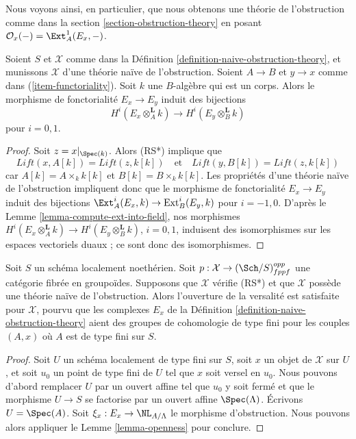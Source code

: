 \noindent
Nous voyons ainsi, en particulier, que nous obtenons une théorie de l'obstruction
comme dans la section \ref{section-obstruction-theory} en posant
$\mathcal{O}_x( - ) = \Ext^1_A(E_x, -)$.

\begin{lemma}
\label{lemma-naive-obstruction-theory-qis}
Soient $S$ et $\mathcal{X}$ comme dans la
Définition \ref{definition-naive-obstruction-theory},
et munissons $\mathcal{X}$ d'une théorie naïve de l'obstruction.
Soient $A \to B$ et $y \to x$ comme dans (\ref{item-functoriality}).
Soit $k$ une $B$-algèbre qui est un corps. Alors le morphisme de fonctorialité
$E_x \to E_y$ induit des bijections
$$
H^i(E_x \otimes_A^{\mathbf{L}} k) \to H^i(E_y \otimes_B^{\mathbf{L}} k)
$$
pour $i = 0, 1$.
\end{lemma}

\begin{proof}
Soit $z = x|_{\Spec(k)}$. Alors (RS*) implique que
$$
\textit{Lift}(x, A[k]) = \textit{Lift}(z, k[k])
\quad\text{et}\quad
\textit{Lift}(y, B[k]) = \textit{Lift}(z, k[k])
$$
car $A[k] = A \times_k k[k]$ et $B[k] = B \times_k k[k]$.
Les propriétés d'une théorie naïve de l'obstruction impliquent donc que le
morphisme de fonctorialité $E_x \to E_y$ induit des bijections
$\Ext^i_A(E_x, k) \to \text{Ext}^i_B(E_y, k)$
pour $i = -1, 0$. D'après le Lemme \ref{lemma-compute-ext-into-field}, nos morphismes
$H^i(E_x \otimes_A^{\mathbf{L}} k) \to H^i(E_y \otimes_B^{\mathbf{L}} k)$,
$i = 0, 1$, induisent des isomorphismes sur les espaces vectoriels duaux ; ce sont donc des isomorphismes.
\end{proof}

\begin{lemma}
\label{lemma-naive-obstruction-theory-gives-openness}
Soit $S$ un schéma localement noethérien. Soit
$p : \mathcal{X} \to (\Sch/S)_{fppf}^{opp}$ une catégorie fibrée en groupoïdes.
Supposons que $\mathcal{X}$ vérifie (RS*)
et que $\mathcal{X}$ possède une théorie naïve de l'obstruction.
Alors l'ouverture de la versalité est satisfaite pour $\mathcal{X}$, pourvu que les
complexes $E_x$ de la Définition \ref{definition-naive-obstruction-theory}
aient des groupes de cohomologie de type fini pour les couples $(A, x)$ où
$A$ est de type fini sur $S$.
\end{lemma}

\begin{proof}
Soit $U$ un schéma localement de type fini sur $S$, soit $x$ un objet de
$\mathcal{X}$ sur $U$, et soit $u_0$ un point de type fini de $U$ tel que
$x$ soit versel en $u_0$. Nous pouvons d'abord remplacer $U$ par un ouvert affine
tel que $u_0$ y soit fermé et que le morphisme $U \to S$ se factorise par un ouvert
affine $\Spec(\Lambda)$. Écrivons $U = \Spec(A)$. Soit
$\xi_x : E_x \to \NL_{A/\Lambda}$ le morphisme d'obstruction.
Nous pouvons alors appliquer le Lemme \ref{lemma-openness} pour conclure.
\end{proof}
 
